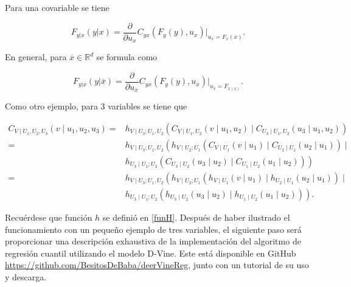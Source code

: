 Para una covariable se tiene

\vspace{-0.5cm}
\begin{equation}
    F_{y|x}(y|x) = \frac{\partial }{\partial u_x} C_{yx}(F_y(y), u_x) \Big|_{u_x = F_x(x)} .
\end{equation}

En general, para $\overline{x} \in  \mathbb{R}^d$ se formula como

\vspace{-0.5cm}
\begin{equation}
    F_{y|\overline{x}}(y|\overline{x}) = \frac{\partial }{\partial u_{\overline{x}}} C_{y\overline{x}}(F_y(y), u_{\overline{x}}) \Big|_{u_{\overline{x}} =F_{\overline{x}(x)}} .
\end{equation}

Como otro ejemplo, para $3$ variables se tiene que 

\vspace{-0.5cm}
\begin{equation}\label{quantileReg}
    \begin{aligned}
    C_{V \mid U_1, U_2, U_3}\left(v \mid u_1, u_2, u_3\right) 
    = & h_{V \mid U_3 ; U_1, U_2}\left(C_{V \mid U_1, U_2}\left(v \mid u_1, u_2\right) \mid C_{U_3 \mid U_1, U_2}\left(u_3 \mid u_1, u_2\right)\right) \\
    = & h_{V \mid U_3 ; U_1, U_2}\left(h_{V \mid U_2 ; U_1}\left(C_{V \mid U_1}\left(v \mid u_1\right) \mid C_{U_2 \mid U_1}\left(u_2 \mid u_1\right)\right) \mid\right. \\
    & \left.h_{U_3 \mid U_1 ; U_2}\left(C_{U_3 \mid U_2}\left(u_3 \mid u_2\right) \mid C_{U_1 \mid U_2}\left(u_1 \mid u_2\right)\right)\right) \\ 
    = & h_{V \mid U_3 ; U_1, U_2}\left(h_{V \mid U_2 ; U_1}\left(h_{V \mid U_1}\left(v \mid u_1\right) \mid h_{U_2 \mid U_1}\left(u_2 \mid u_1\right)\right) \mid\right. \\
    & \left.h_{U_3 \mid U_1 ; U_2}\left(h_{U_3 \mid U_2}\left(u_3 \mid u_2\right) \mid h_{U_1 \mid U_2}\left(u_1 \mid u_2\right)\right)\right).
    \end{aligned}
\end{equation}

Recuérdese que función $h$ se definió en \eqref{funH}. Después de haber ilustrado el funcionamiento con un pequeño ejemplo de tres variables, el siguiente paso será proporcionar una descripción exhaustiva de la implementación del algoritmo de regresión cuantil utilizando el modelo D-Vine. Este está disponible en GitHub \url{https://github.com/BesitosDeBaba/deerVineReg}, junto con un tutorial de su uso y descarga.

